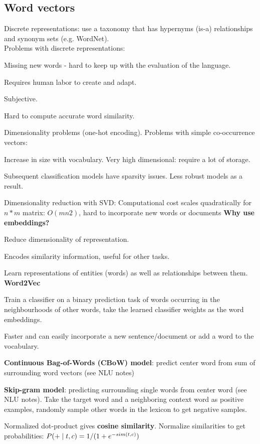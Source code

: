 \documentclass[12pt]{article}
\begin{document}
\subsection{Word vectors}
\par Discrete representations: use a taxonomy that has hypernyms (is-a) relationships and synonym sets (e.g. WordNet).
\\
Problems with discrete representations:
\ulb
\item Missing new words - hard to keep up with the evaluation of the language.
\item Requires human labor to create and adapt.
\item Subjective.
\item Hard to compute accurate word similarity.
\item Dimensionality problems (one-hot encoding).
\ule
Problems with simple co-occurrence vectors:
\ulb
\item Increase in size with vocabulary. Very high dimensional: require a lot of storage.
\item Subsequent classification models have sparsity issues. Less robust models as a result.
\item Dimensionality reduction with SVD: Computational cost scales quadratically for $n*m$ matrix: $O(mn2)$, hard to incorporate new words or documents
\ule
\textbf{Why use embeddings?}
\ulb
\item Reduce dimensionality of representation.
\item Encodes similarity information, useful for other tasks.
\item Learn representations of entities (words) as well as relationships between them.
\ule
\textbf{Word2Vec}
\ulb
\item Train a classifier on a binary prediction task of words occurring in the neighbourhoods of other words, take the learned classifier weights as the word embeddings.
\item Faster and can easily incorporate a new sentence/document or add a word to the vocabulary.
\item \textbf{Continuous Bag-of-Words (CBoW) model}: predict center word from sum of surrounding word vectors (see NLU notes)
\item \textbf{Skip-gram model}: predicting surrounding single words from center word (see NLU notes). Take the target word and a neighboring context word as positive examples, randomly sample other words in the lexicon to get negative samples.
\item Normalized dot-product gives \textbf{cosine similarity}. Normalize similarities to get probabilities: $P(+  \mid  t,c) = 1 / (1 + e^{-sim(t,c)})$
\end{document}

